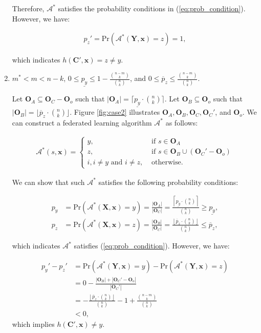 \documentclass[letterpaper]{article} %
\begin{document}
\begin{enumerate}[label={\bfseries Case \arabic*:}, wide=0pt]
Therefore, $\mathcal{A}^*$ satisfies the probability conditions in (\ref{eq:prob_condition}). However, we have:

\begin{align}
	p_z' = \text{Pr}(\mathcal{A}^*(\mathbf{Y},\mathbf{x})=z) = 1,
\end{align}

which indicates $h(\mathbf{C'}, \mathbf{x}) = z \neq y$.

 \item $m^* < m < n-k$, $0 \le \underline{p_y} \le 1-\frac{{n-m \choose k}}{{n \choose k}}$, and $0\le \overline{p}_z \le \frac{{n-m \choose k}}{{n \choose k}}$.

Let $\mathbf{O}_A\subseteq \mathbf{O}_C - \mathbf{O}_o$ such that $|\mathbf{O}_A|=\lceil\underline{p_y} \cdot {n \choose k}\rceil$. 
Let $\mathbf{O}_B\subseteq \mathbf{O}_o$ such that $|\mathbf{O}_B|=\lfloor\overline{p}_z \cdot {n \choose k}\rfloor$. 
Figure \ref{fig:case2} illustrates $\mathbf{O}_A, \mathbf{O}_B,\mathbf{O}_C, \mathbf{O}_C'$, and $\mathbf{O}_o$. We can construct a federated 
learning algorithm $\mathcal{A}^*$ as follows:

	\begin{align}
		\mathcal{A}^*(s,\mathbf{x})=
		\begin{cases}
 			y, &\text{ if } s\in \mathbf{O}_A\\
			z, &\text{ if } s\in \mathbf{O}_B\cup(\mathbf{O}_C'-\mathbf{O}_o)\\
 			i, i\neq y \text{ and } i\neq z, &\text{ otherwise}.
		\end{cases}
	\end{align}

	We can show that such $\mathcal{A}^*$ satisfies the following probability conditions:

	\begin{align}
		p_y &= \text{Pr}(\mathcal{A}^*(\mathbf{X},\mathbf{x})=y)= \frac{|\mathbf{O}_A|}{|\mathbf{O}_C|} = \frac{\left\lceil\underline{p_y} \cdot {n \choose k}\right\rceil}{{n \choose k}}\ge \underline{p_y},\\
		p_z &= \text{Pr}(\mathcal{A}^*(\mathbf{X},\mathbf{x})=z) = \frac{|\mathbf{O}_B|}{|\mathbf{O}_C|} = \frac{\left\lfloor\overline{p}_z \cdot {n \choose k}\right\rfloor}{{n \choose k}} \le\overline{p}_z,
	\end{align}

	which indicates $\mathcal{A}^*$ satisfies (\ref{eq:prob_condition}). However, we have:

	\begin{align}
		p_y' - p_z' &= \text{Pr}(\mathcal{A}^*(\mathbf{Y},\mathbf{x})=y) - \text{Pr}(\mathcal{A}^*(\mathbf{Y},\mathbf{x})=z)\\
					&= 0 - \frac{|\mathbf{O}_B|+|\mathbf{O}_C'-\mathbf{O}_o|}{|\mathbf{O}_C'|}\\
					&= -\frac{\left\lfloor\overline{p}_z \cdot {n \choose k}\right\rfloor}{{n\choose k}} - 1 + \frac{{n-m \choose k}}{{n \choose k}}\\
					&< 0, 
	\end{align}
	which implies $h(\mathbf{C'}, \mathbf{x}) \neq y$.


\end{enumerate}
\end{document}

